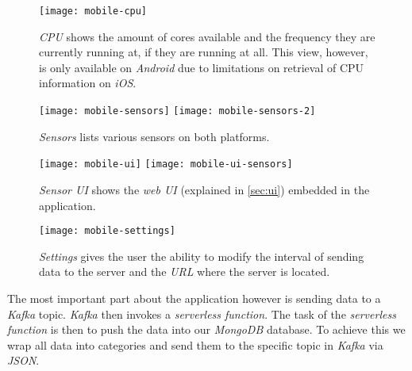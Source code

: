 \begin{figure}[H]
  \centering
  \texttt{[image: mobile-cpu]}
  \caption{\textit{CPU} shows the amount of cores available and the frequency they are currently
  running at, if they are running at all. This view, however, is only available on \textit{Android}
  due to limitations on retrieval of CPU information on \textit{iOS}.}
\end{figure}

\begin{figure}[H]
  \centering
  \texttt{[image: mobile-sensors]}
  \texttt{[image: mobile-sensors-2]}
  \caption{\textit{Sensors} lists various sensors on both platforms.}
\end{figure}

\begin{figure}[H]
  \centering
  \texttt{[image: mobile-ui]}
  \texttt{[image: mobile-ui-sensors]}
  \caption{\textit{Sensor UI} shows the \textit{web UI} (explained in \autoref{sec:ui}) embedded in the application.}
\end{figure}

\begin{figure}[H]
  \centering
  \texttt{[image: mobile-settings]}
  \caption{\textit{Settings} gives the user the ability to modify the interval of sending data to the
  server and the \textit{URL} where the server is located.}
\end{figure}

The most important part about the application however is sending data to a \textit{Kafka} topic.
\textit{Kafka} then invokes a \textit{serverless function}. The task of the \textit{serverless
function} is then to push the data into our \textit{MongoDB} database. To achieve this we wrap all
data into categories and send them to the specific topic in \textit{Kafka} via \textit{JSON}.
